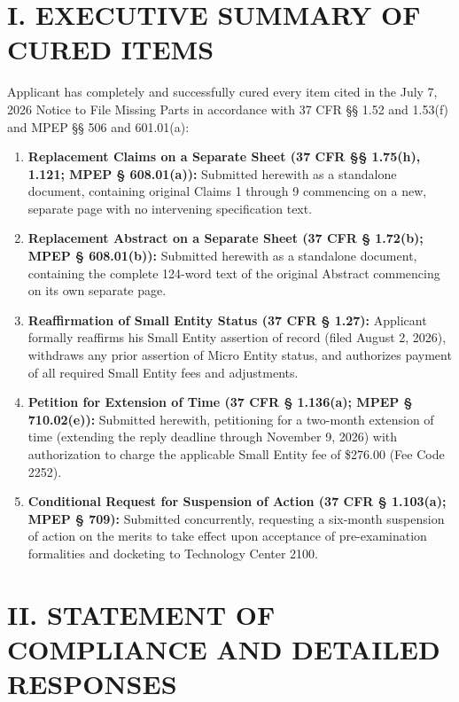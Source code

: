 \documentclass[11pt,letterpaper]{article}
\begin{document}
\section*{I. EXECUTIVE SUMMARY OF CURED ITEMS}

Applicant has completely and successfully cured every item cited in the July 7, 2026 Notice to File Missing Parts in accordance with 37 CFR \S\S{} 1.52 and 1.53(f) and MPEP \S\S{} 506 and 601.01(a):

\begin{enumerate}[leftmargin=2em, itemsep=3pt, parsep=0pt]
    \item \textbf{Replacement Claims on a Separate Sheet (37 CFR \S\S{} 1.75(h), 1.121; MPEP \S{} 608.01(a)):} Submitted herewith as a standalone document, containing original Claims 1 through 9 commencing on a new, separate page with no intervening specification text.
    \item \textbf{Replacement Abstract on a Separate Sheet (37 CFR \S{} 1.72(b); MPEP \S{} 608.01(b)):} Submitted herewith as a standalone document, containing the complete 124-word text of the original Abstract commencing on its own separate page.
    \item \textbf{Reaffirmation of Small Entity Status (37 CFR \S{} 1.27):} Applicant formally reaffirms his Small Entity assertion of record (filed August 2, 2026), withdraws any prior assertion of Micro Entity status, and authorizes payment of all required Small Entity fees and adjustments.
    \item \textbf{Petition for Extension of Time (37 CFR \S{} 1.136(a); MPEP \S{} 710.02(e)):} Submitted herewith, petitioning for a two-month extension of time (extending the reply deadline through November 9, 2026) with authorization to charge the applicable Small Entity fee of \$276.00 (Fee Code 2252).
    \item \textbf{Conditional Request for Suspension of Action (37 CFR \S{} 1.103(a); MPEP \S{} 709):} Submitted concurrently, requesting a six-month suspension of action on the merits to take effect upon acceptance of pre-examination formalities and docketing to Technology Center 2100.
\end{enumerate}

\newpage

\section*{II. STATEMENT OF COMPLIANCE AND DETAILED RESPONSES}
\end{document}
